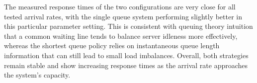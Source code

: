 \documentclass[a4paper,10pt]{article}
\begin{document}
The measured response times of the two configurations are very close for all tested arrival rates, with the single queue system performing slightly better in this particular parameter setting. This is consistent with queuing theory intuition that a common waiting line tends to balance server idleness more effectively, whereas the shortest queue policy relies on instantaneous queue length information that can still lead to small load imbalances. Overall, both strategies remain stable and show increasing response times as the arrival rate approaches the system’s capacity. 

\end{document}
